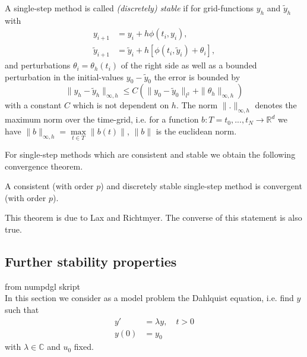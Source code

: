 	\begin{definition}\label{Discrete_Stability_SingleStep - lecture notes for numpdgl}
		A single-step method is called \emph{(discretely) stable} if for grid-functions $y_h$ and $\tilde{y}_h$ with
		\begin{align}
			y_{i+1} &= y_i + h \phi(t_i, y_i), \\
			\tilde{y}_{i+1} &=  \tilde{y}_i + h [\phi(t_i, \tilde{y}_i) + \theta_i],
		\end{align}
		and perturbations $\theta_i = \theta_h(t_i)$ of the right side as well as a bounded perturbation in the initial-values $y_0 - \tilde{y}_0$ the error is bounded by
		\begin{displaymath}
			\|y_h - \tilde{y}_h\|_{\infty,h} \leq C (\|y_0 - \tilde{y}_0\|_{l^2} + \|\theta_h\|_{\infty,h})
		\end{displaymath}
		with a constant $C$ which is not dependent on $h$. The norm $\|.\|_{\infty,h}$ denotes the maximum norm over the time-grid, i.e. for a function $b: T={t_0,...,t_N} \to \mathbb{R}^d$ we have $\|b\|_{\infty,h} = \max\limits_{t \in T}\|b(t)\|$, $\|b\|$ is the euclidean norm.
	\end{definition}
	
	For single-step methods which are consistent and stable we obtain the following convergence theorem.
	
	\begin{theorem}\label{Lax-Richtmyer}
		A consistent (with order $p$) and discretely stable single-step method is convergent (with order $p$).
	\end{theorem}
	
	This theorem is due to Lax and Richtmyer. The converse of this statement is also true. 

	\subsection{Further stability properties}
		from numpdgl skript \\
		In this section we consider as a model problem the Dahlquist equation, i.e. find $y$ such that
		\begin{align}
			y' &= \lambda y, \quad t > 0 \\
			y(0) &= y_0
		\end{align}
		with $\lambda \in \mathbb{C}$ and $u_0$ fixed.
		
